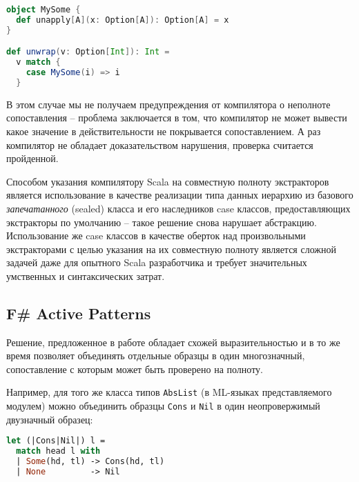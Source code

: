 \noindent
\begin{minipage}{\linewidth}
\begin{lstlisting}[language=scala]
object MySome {
  def unapply[A](x: Option[A]): Option[A] = x
}

def unwrap(v: Option[Int]): Int = 
  v match {
    case MySome(i) => i
  }
\end{lstlisting}
\end{minipage}

В этом случае мы не получаем предупреждения от компилятора о неполноте сопоставления -- проблема заключается в том, что компилятор не может вывести какое значение в действительности не покрывается сопоставлением. А раз компилятор не обладает доказательством нарушения, проверка считается пройденной. 

Способом указания компилятору Scala на совместную полноту экстракторов является использование в качестве реализации типа данных иерархию из базового \textit{запечатанного} (sealed) класса и его наследников case классов, предоставляющих экстракторы по умолчанию -- такое решение снова нарушает абстракцию. Использование же case классов в качестве оберток над произвольными экстракторами с целью указания на их совместную полноту является сложной задачей даже для опытного Scala разработчика и требует значительных умственных и синтаксических затрат. 


\subsection{F\# Active Patterns} \label{sec:active_patterns}
Решение, предложенное в работе \cite{syme2007extensible} обладает схожей выразительностью и в то же время позволяет объединять отдельные образцы в один многозначный, сопоставление с которым может быть проверено на полноту. 

Например, для того же класса типов \lstinline|AbsList| (в ML-языках представляемого модулем) можно объединить образцы \lstinline|Cons| и \lstinline|Nil| в один неопровержимый двузначный образец:

\noindent
\begin{minipage}{\linewidth}
\begin{lstlisting}[language=ocaml]
let (|Cons|Nil|) l =
  match head l with
  | Some(hd, tl) -> Cons(hd, tl)
  | None         -> Nil
\end{lstlisting}
\end{minipage}

